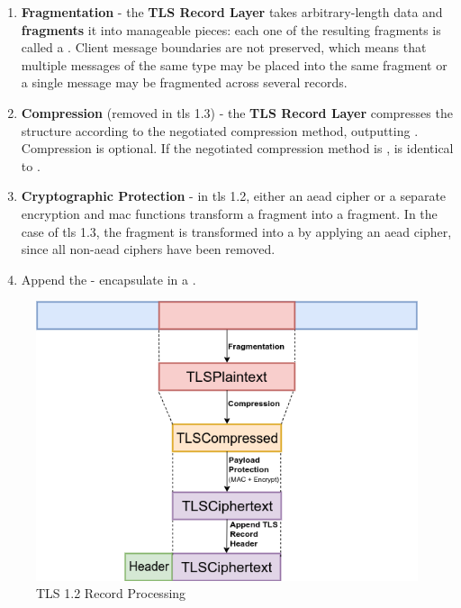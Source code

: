 \documentclass{llncs}
\begin{document}
\begin{enumerate}
  \item \textbf{Fragmentation} - the \textbf{TLS Record Layer} takes arbitrary-length data and \textbf{fragments}
  it into manageable pieces: each one of the resulting fragments is called a .
  Client message boundaries are not preserved, which means that multiple messages
  of the same type may be placed into the same fragment or a single message may
  be fragmented across several records.
  \item  \textbf{Compression} (removed in \gls{tls} 1.3) - the \textbf{TLS Record Layer} compresses the
   structure according to the negotiated compression method,
  outputting . Compression is optional. If the negotiated compression
  method is ,  is identical to .
  \item \textbf{Cryptographic Protection} - in \gls{tls} 1.2, either an
  \gls{aead} cipher or a separate encryption and \gls{mac} functions transform a
   fragment into a  fragment. In the case
  of \gls{tls} 1.3, the  fragment is transformed into a  by applying an \gls{aead} cipher, since all
  non-\gls{aead} ciphers have been removed.
  \item Append the  - encapsulate 
  in a .
\end{enumerate}

\begin{figure}
  \centering
  \includegraphics[width=1.0\textwidth]{img/tls-record-processing-3.png}
  \caption{\label{fig:tls-record-processing}TLS 1.2 Record Processing}
\end{figure}
\end{document}
